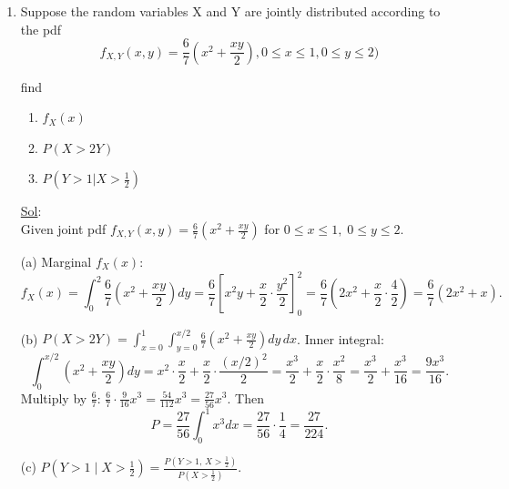 \begin{enumerate}
	      (d) Conditional expectation:
	      \[
		      \mathbb{E}[Y\mid X=x] = \int_0^1 y\cdot\frac{4x+6y}{4x+3}\,dy = \frac{1}{4x+3}\int_0^1 (4xy+6y^2)\,dy = \frac{1}{4x+3}\left[2xy^2+2y^3\right]_{0}^{1} = \frac{2x+2}{4x+3}= \frac{2(x+1)}{4x+3}.
	      \]

	      \[
		      \boxed{f_X(x)=\frac{4x+3}{5}}\quad
		      \boxed{f_{Y|X}(y|x)=\frac{4x+6y}{4x+3}}\quad
		      \boxed{P\!\left(\frac14\le Y\le\frac34\mid X=\frac12\right)=\frac12}\quad
		      \boxed{\mathbb{E}[Y\mid X=x]=\frac{2(x+1)}{4x+3}}
	      \]

	\item[20.] Suppose the random variables X and Y are jointly distributed according to the pdf
	      \[
		      f_{X, Y} (x, y) = \frac{6}{7}(x^2 + \frac{xy}{2}), 0 \leq x \leq 1, 0 \leq y \leq 2)
	      \]

	      find
	      \begin{enumerate}
		      \item \(f_X (x)\)
		      \item \(P(X > 2Y)\)
		      \item \(P(Y > 1 | X > \frac{1}{2})\)
	      \end{enumerate}

	      \underline{Sol}: \\

	      Given joint pdf \(f_{X,Y}(x,y) = \frac{6}{7}\left(x^2 + \frac{xy}{2}\right)\) for \(0 \le x \le 1,\; 0 \le y \le 2\).

	      (a) Marginal \(f_X(x)\):
	      \[
		      f_X(x) = \int_0^2 \frac{6}{7}\left(x^2 + \frac{xy}{2}\right) dy = \frac{6}{7}\left[ x^2 y + \frac{x}{2}\cdot\frac{y^2}{2} \right]_0^2 = \frac{6}{7}\left(2x^2 + \frac{x}{2}\cdot\frac{4}{2}\right) = \frac{6}{7}(2x^2 + x).
	      \]

	      (b) \(P(X > 2Y) = \int_{x=0}^1 \int_{y=0}^{x/2} \frac{6}{7}\left(x^2 + \frac{xy}{2}\right) dy\,dx\).
	      Inner integral:
	      \[
		      \int_0^{x/2} \left(x^2 + \frac{xy}{2}\right) dy = x^2\cdot\frac{x}{2} + \frac{x}{2}\cdot\frac{(x/2)^2}{2} = \frac{x^3}{2} + \frac{x}{2}\cdot\frac{x^2}{8} = \frac{x^3}{2} + \frac{x^3}{16} = \frac{9x^3}{16}.
	      \]
	      Multiply by \(\frac{6}{7}\): \(\frac{6}{7}\cdot\frac{9}{16}x^3 = \frac{54}{112}x^3 = \frac{27}{56}x^3\). Then
	      \[
		      P = \frac{27}{56}\int_0^1 x^3 dx = \frac{27}{56}\cdot\frac{1}{4} = \frac{27}{224}.
	      \]

	      (c) \(P(Y>1 \mid X>\frac12) = \frac{P(Y>1,\,X>\frac12)}{P(X>\frac12)}\).


\end{enumerate}
